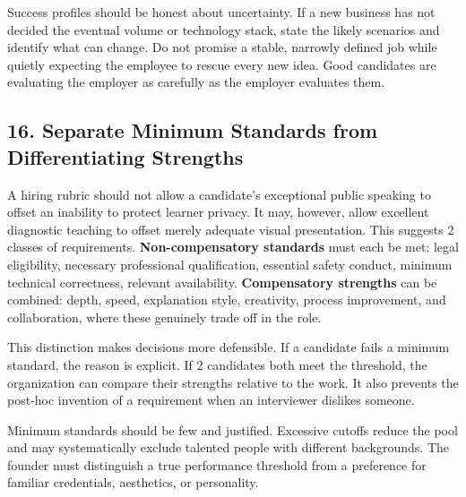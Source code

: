 Success profiles should be honest about uncertainty. If a new business has not decided the eventual volume or technology stack, state the likely scenarios and identify what can change. Do not promise a stable, narrowly defined job while quietly expecting the employee to rescue every new idea. Good candidates are evaluating the employer as carefully as the employer evaluates them.

\subsection*{16. Separate Minimum Standards from Differentiating Strengths}

A hiring rubric should not allow a candidate's exceptional public speaking to offset an inability to protect learner privacy. It may, however, allow excellent diagnostic teaching to offset merely adequate visual presentation. This suggests 2 classes of requirements. \textbf{Non-compensatory standards} must each be met: legal eligibility, necessary professional qualification, essential safety conduct, minimum technical correctness, relevant availability. \textbf{Compensatory strengths} can be combined: depth, speed, explanation style, creativity, process improvement, and collaboration, where these genuinely trade off in the role.

This distinction makes decisions more defensible. If a candidate fails a minimum standard, the reason is explicit. If 2 candidates both meet the threshold, the organization can compare their strengths relative to the work. It also prevents the post-hoc invention of a requirement when an interviewer dislikes someone.

Minimum standards should be few and justified. Excessive cutoffs reduce the pool and may systematically exclude talented people with different backgrounds. The founder must distinguish a true performance threshold from a preference for familiar credentials, aesthetics, or personality.
